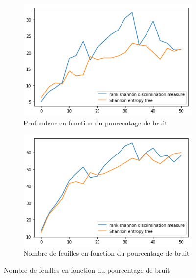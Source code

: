 \documentclass[a4paper]{article}
\begin{document}
\begin{figure}[H]
    \begin{subfigure}[c]{0.46\textwidth}
        \centering
        \includegraphics[width=\textwidth]{images/depth_2.png}
        \caption{Profondeur en fonction du pourcentage de bruit}
    \label{subresults:depth2}
    \end{subfigure}
    \begin{subfigure}[c]{0.46\textwidth}
        \centering
        \includegraphics[width=\textwidth]{images/leaves_2.png}
        \caption{Nombre de feuilles en fonction du pourcentage de bruit}
    \label{subresults:leaves2}
    \end{subfigure}


\end{figure}
\end{document}

